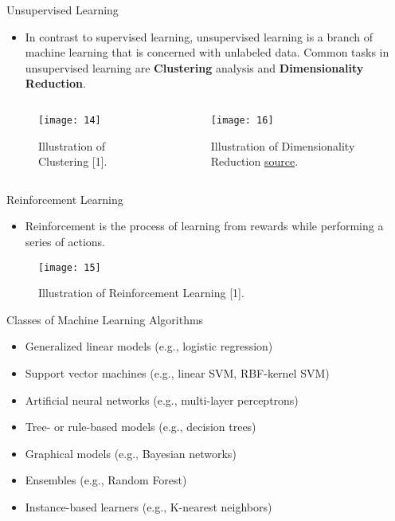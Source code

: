 \documentclass[compress,oilve]{beamer}
\begin{document}
\begin{frame}{Unsupervised Learning}
\begin{itemize}
\item In contrast to supervised learning, unsupervised learning is a branch of machine learning that is concerned with unlabeled data. Common tasks in unsupervised learning are \textbf{Clustering} analysis and \textbf{Dimensionality Reduction}.
\end{itemize}
\begin{columns}
\begin{column}{0.4\textwidth}
\begin{figure}
 \centering
 \texttt{[image: 14]}  
 \caption{Illustration of Clustering [1].}
\end{figure}
\end{column}
\begin{column}{0.6\textwidth}
\begin{figure}
 \centering
 \texttt{[image: 16]}  
 \caption{Illustration of Dimensionality Reduction \href{https://www.researchgate.net/figure/Dimensionality-reduction-effect-over-an-artificial-3-dimensional-spherical-shell_fig1_313787026}{source}.}
\end{figure}
\end{column}
\end{columns}
\end{frame}

\begin{frame}{Reinforcement Learning}
\begin{itemize}
\item Reinforcement is the process of learning from rewards while performing a series of actions.
\end{itemize}
\begin{figure}
 \centering
 \texttt{[image: 15]}  
 \caption{Illustration of Reinforcement Learning [1].}
\end{figure}
\end{frame}

\begin{frame}{Classes of Machine Learning Algorithms}
\begin{itemize}
\item Generalized linear models (e.g., logistic regression)
\item Support vector machines (e.g., linear SVM, RBF-kernel SVM)
\item Artificial neural networks (e.g., multi-layer perceptrons)
\item Tree- or rule-based models (e.g., decision trees)
\item Graphical models (e.g., Bayesian networks)
\item Ensembles (e.g., Random Forest)
\item Instance-based learners (e.g., K-nearest neighbors)
\end{itemize}
\end{frame}
\end{document}

